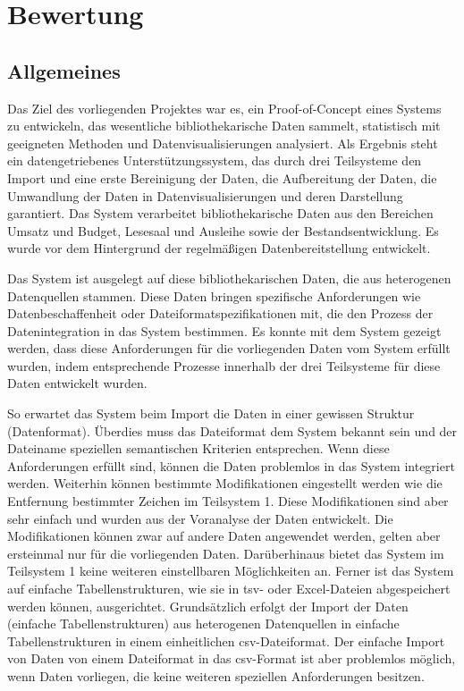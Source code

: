 \section{Bewertung}

\subsection{Allgemeines}
\label{chap:five_three_one}
Das Ziel des vorliegenden Projektes war es, ein Proof-of-Concept eines Systems zu entwickeln, 
das wesentliche bibliothekarische Daten sammelt, statistisch mit geeigneten Methoden und
Datenvisualisierungen analysiert. Als Ergebnis steht ein datengetriebenes 
Unterstützungssystem, das durch drei Teilsysteme den Import und eine erste Bereinigung der Daten,
die Aufbereitung der Daten, die Umwandlung der Daten in Datenvisualisierungen und deren Darstellung garantiert. 
Das System verarbeitet bibliothekarische Daten aus den Bereichen Umsatz und Budget, Lesesaal und Ausleihe 
sowie der Bestandsentwicklung. Es wurde vor dem Hintergrund der regelmäßigen Datenbereitstellung entwickelt.

Das System ist ausgelegt auf diese bibliothekarischen Daten, die aus heterogenen Datenquellen stammen.
Diese Daten bringen spezifische Anforderungen wie Datenbeschaffenheit oder Dateiformatspezifikationen mit, 
die den Prozess der Datenintegration in das System bestimmen. Es konnte mit dem System gezeigt werden, 
dass diese Anforderungen für die vorliegenden Daten vom System erfüllt wurden, indem entsprechende Prozesse innerhalb
der drei Teilsysteme für diese Daten entwickelt wurden.

So erwartet das System beim Import die Daten in einer gewissen Struktur (Datenformat). 
Überdies muss das Dateiformat dem System bekannt sein und der Dateiname speziellen semantischen 
Kriterien entsprechen. Wenn diese Anforderungen erfüllt sind, können die Daten problemlos in das System integriert werden.
Weiterhin können bestimmte Modifikationen eingestellt werden wie die Entfernung
bestimmter Zeichen im Teilsystem 1. Diese Modifikationen sind aber sehr einfach und wurden aus der Voranalyse
der Daten entwickelt. Die Modifikationen können zwar auf andere Daten angewendet werden, gelten aber ersteinmal nur für die vorliegenden Daten. 
Darüberhinaus bietet das System im Teilsystem 1 keine weiteren einstellbaren Möglichkeiten an. Ferner ist das System auf einfache 
Tabellenstrukturen, wie sie in tsv- oder Excel-Dateien abgespeichert werden können, ausgerichtet.
Grundsätzlich erfolgt der Import der Daten (einfache Tabellenstrukturen) aus heterogenen Datenquellen 
in einfache Tabellenstrukturen in einem einheitlichen csv-Dateiformat. Der einfache Import von Daten von einem Dateiformat 
in das csv-Format ist aber problemlos möglich, wenn Daten vorliegen, die keine weiteren speziellen
Anforderungen besitzen.

